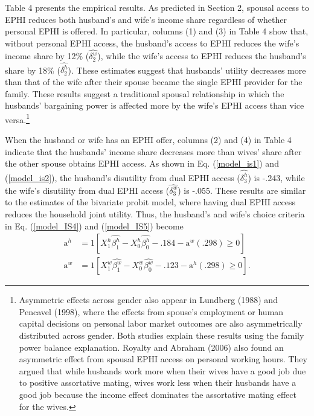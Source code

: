 \documentclass[legno,11pt]{article}
\begin{document}
Table 4 presents the empirical results. As predicted in Section 2,
spousal access to EPHI reduces both husband's and wife's income
share regardless of whether personal EPHI is offered. In particular,
columns (1) and (3) in Table 4 show that, without personal EPHI
access, the husband's access to EPHI reduces the wife's income share
by 12\% ($\widehat{\delta^{w}_{2}}$), while the wife's access to
EPHI reduces the husband's share by 18\%
($\widehat{\delta^{h}_{2}}$). These estimates suggest that husbands'
utility decreases more than that of the wife after their spouse
became the single EPHI provider for the family. These results
suggest a traditional spousal relationship in which the husbands'
bargaining power is affected more by the wife's EPHI access than
vice versa.\footnote{Asymmetric effects across gender also appear in
Lundberg (1988) and Pencavel (1998), where the effects from spouse's
employment or human capital decisions on personal labor market
outcomes are also asymmetrically distributed across gender. Both
studies explain these results using the family power balance
explanation. Royalty and Abraham (2006) also found an asymmetric
effect from spousal EPHI access on personal working hours. They
argued that while husbands work more when their wives have a good
job due to positive assortative mating,
 wives work
less when their husbands have a good job because the income effect dominates the assortative mating effect for the wives.}
\par

When the husband or wife has an EPHI offer, columns (2) and (4) in
Table 4 indicate that the husbands' income share decreases more than
wives' share after the other spouse obtains EPHI access. As shown in
Eq. (\ref{model_is1}) and  (\ref{model_is2}), the husband's
disutility from dual EPHI access ($\widehat{\delta^{h}_{3}}$) is
-.243, while the wife's disutility from dual EPHI access
($\widehat{\delta^{w}_{3}}$) is -.055. These results are similar to
the estimates of the bivariate probit model, where having dual EPHI
access reduces the household joint utility. Thus, the husband's and
wife's choice criteria in Eq. (\ref{model_IS4}) and
(\ref{model_IS5}) become
\begin{align}
\text{a}^{h}&= 1[X^{h}_{1}\widehat{\beta^{h}_{1}}-X^{h}_{0}\widehat{\beta^{h}_{0}}-.184-\text{a}^{w}(.298)\geq 0]\\
\text{a}^{w}&=
1[X^{w}_{1}\widehat{\beta^{w}_{1}}-X^{w}_{0}\widehat{\beta^{w}_{0}}-.123-\text{a}^{h}(.298)\geq
0].
\end{align}
\par
\end{document}
